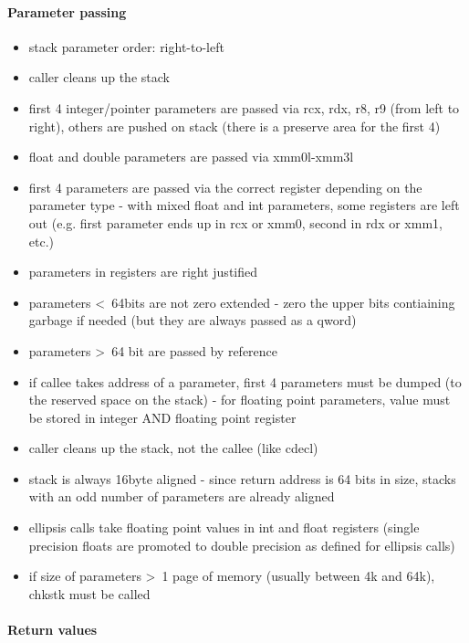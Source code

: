 \paragraph{Parameter passing}

\begin{itemize}
\item stack parameter order: right-to-left
\item caller cleans up the stack
\item first 4 integer/pointer parameters are passed via rcx, rdx, r8, r9 (from left to right), others are pushed on stack (there is a
preserve area for the first 4)
\item float and double parameters are passed via xmm0l-xmm3l
\item first 4 parameters are passed via the correct register depending on the parameter type - with mixed float and int parameters,
some registers are left out (e.g. first parameter ends up in rcx or xmm0, second in rdx or xmm1, etc.)
\item parameters in registers are right justified
\item parameters \textless\ 64bits are not zero extended - zero the upper bits contiaining garbage if needed (but they are always
passed as a qword)
\item parameters \textgreater\ 64 bit are passed by reference
\item if callee takes address of a parameter, first 4 parameters must be dumped (to the reserved space on the stack) - for
floating point parameters, value must be stored in integer AND floating point register
\item caller cleans up the stack, not the callee (like cdecl)
\item stack is always 16byte aligned - since return address is 64 bits in size, stacks with an odd number of parameters are
already aligned
\item ellipsis calls take floating point values in int and float registers (single precision floats are promoted to double precision
as defined for ellipsis calls)
\item if size of parameters \textgreater\ 1 page of memory (usually between 4k and 64k), chkstk must be called
\end{itemize}


\paragraph{Return values}

